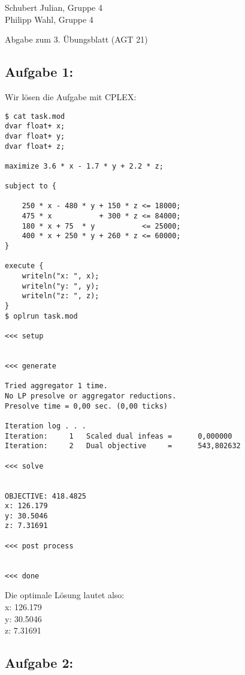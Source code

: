 \documentclass[a4paper]{article}
\begin{document}
\begin{small}
	\noindent
	Schubert Julian, Gruppe 4 \\
	Philipp Wahl, Gruppe 4
\end{small}
\bigskip

\begin{center}
	\LARGE Abgabe zum 3. Übungsblatt (AGT 21)
\end{center}
\smallskip

\subsection*{Aufgabe 1:}
Wir lösen die Aufgabe mit CPLEX:
\begin{lstlisting}[frame=single]
$ cat task.mod 
dvar float+ x;
dvar float+ y;
dvar float+ z;

maximize 3.6 * x - 1.7 * y + 2.2 * z;

subject to {

	250 * x - 480 * y + 150 * z <= 18000;
	475 * x           + 300 * z <= 84000;
	180 * x + 75  * y           <= 25000;
	400 * x + 250 * y + 260 * z <= 60000;
}

execute {
	writeln("x: ", x);
	writeln("y: ", y);
	writeln("z: ", z);
}
$ oplrun task.mod 

<<< setup


<<< generate

Tried aggregator 1 time.
No LP presolve or aggregator reductions.
Presolve time = 0,00 sec. (0,00 ticks)

Iteration log . . .
Iteration:     1   Scaled dual infeas =      0,000000
Iteration:     2   Dual objective     =      543,802632

<<< solve


OBJECTIVE: 418.4825
x: 126.179
y: 30.5046
z: 7.31691

<<< post process


<<< done
\end{lstlisting}
Die optimale Lösung lautet also: \\
x: 126.179 \\
y: 30.5046 \\
z: 7.31691 \\

\subsection*{Aufgabe 2:}
\end{document}
